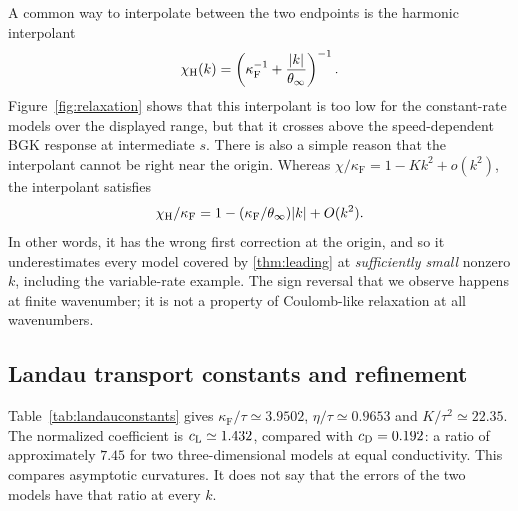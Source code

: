 \documentclass[11pt]{article}
\newcommand{\F}{\kappa_{\mathrm F}}
\theoremstyle{definition}
\theoremstyle{remark}
\numberwithin{equation}{section}
\begin{document}
A common way to interpolate between the two endpoints is the harmonic
interpolant
\begin{equation}
 \chi_{\rm H}(k)=
 \left(\F^{-1}+\frac{|k|}{\theta_\infty}\right)^{-1}.
 \label{eq:harmonic}
\end{equation}
Figure~\ref{fig:relaxation} shows that this interpolant is too low for
the constant-rate models over the displayed range, but that it crosses
above the speed-dependent BGK response at intermediate $s$.
There is also a simple reason that the interpolant cannot be right near
the origin. Whereas
$\chi/\F=1-Kk^2+o(k^2)$, the interpolant satisfies
\[
 \chi_{\rm H}/\F
      =1-(\F/\theta_\infty)|k|+O(k^2).
\]
In other words, it has the wrong first correction at the origin, and so
it underestimates every model covered by \cref{thm:leading} at
\emph{sufficiently small} nonzero $k$, including the variable-rate
example. The sign reversal that we observe happens at finite wavenumber;
it is not a property of Coulomb-like relaxation at all wavenumbers.

\subsection{Landau transport constants and refinement}

\begin{table}[tb]
\centering
\caption{Landau transport quantities from the degree hierarchy.
All values use \eqref{eq:landauform}. The relatively fast convergence
of $\F$ does not imply equally fast convergence of $K$.}
\label{tab:landauconstants}

\end{table}

Table~\ref{tab:landauconstants} gives
$\F/\tau\simeq3.9502$, $\eta/\tau\simeq0.9653$ and
$K/\tau^2\simeq22.35$. The normalized coefficient is
$c_{\rm L}\simeq1.432$, compared with $c_{\rm D}=0.192$:
a ratio of approximately $7.45$ for two three-dimensional models at
equal conductivity. This compares asymptotic curvatures. It does not
say that the errors of the two models have that ratio at every $k$.

\begin{table}[tb]
\centering
\caption{Landau response refinement and quadratic asymptote.
The difference is the absolute difference of the two normalized
responses, not a rigorous error estimate. The small-$k$ expansion
is deliberately not extrapolated across the entire table.}
\label{tab:landaucurves}
\small

\end{table}
\end{document}
